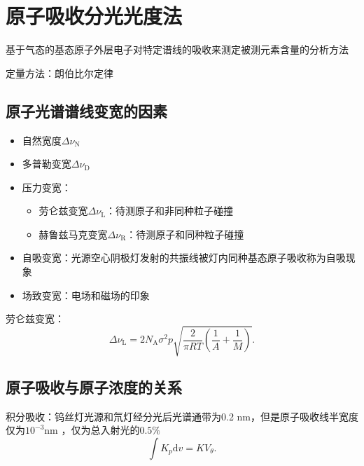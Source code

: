\section{原子吸收分光光度法}%
\label{sec:原子吸收分光光度法}
基于气态的基态原子外层电子对特定谱线的吸收来测定被测元素含量的分析方法
\begin{notation}
定量方法：朗伯比尔定律
\end{notation}
\subsection{原子光谱谱线变宽的因素}%
\label{sub:原子光谱谱线变宽的因素}
\begin{itemize}
    \item 自然宽度$\Delta \nu_\text{N}$
    \item 多普勒变宽$\Delta \nu_\text{D}$
    \item 压力变宽：
        \begin{itemize}
            \item 劳仑兹变宽$\Delta \nu_\text{L}$：待测原子和非同种粒子碰撞
            \item 赫鲁兹马克变宽$\Delta \nu_\text{R}$：待测原子和同种粒子碰撞
        \end{itemize}
    \item 自吸变宽：光源空心阴极灯发射的共振线被灯内同种基态原子吸收称为自吸现象
    \item 场致变宽：电场和磁场的印象
\end{itemize}
劳仑兹变宽：
\[
    \Delta \nu_\text{L} = 2N_\text{A}\sigma^2 p\sqrt{\frac{2}{\pi RT}\left( \frac{1}{A}+\frac{1}{M} \right)}
.\]
\subsection{原子吸收与原子浓度的关系}%
\label{sub:原子吸收与原子浓度的关系}
\begin{notation}
    积分吸收：钨丝灯光源和氘灯经分光后光谱通带为0.2 nm，但是原子吸收线半宽度仅为$10^{-3}\text{nm}$ ，仅为总入射光的$0.5\%$ 
    \[
        \int K_{p}\mathrm{d}v = KV_{\theta}
    .\]
\end{notation}

